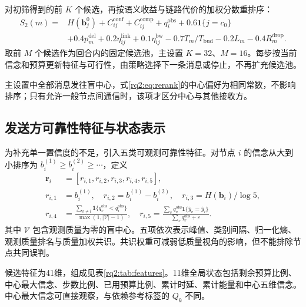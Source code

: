 对初筛得到的前 $K$ 个候选，再按语义收益与链路代价的加权分数重排序：
\begin{equation}
\begin{aligned}
S_2(m)={}&H(\bm b_j^0)+C_{ij}^{\mathrm{conf}}+C_{ij}^{\mathrm{comp}}+q_i^{\mathrm{obs}}
+0.6\mathbf1\{j=c_0\}\\
&+0.4p_m^{\mathrm{del}}+0.2\eta_{ij}^{\mathrm{link}}+0.1\eta_{ij}^{\mathrm{bw}}
-0.7T_m/T_{\mathrm{bud}}-0.2L_m-0.4R_m^{\mathrm{drop}}.
\end{aligned}
\label{rq2:eq:rerank}
\end{equation}
取前 $M$ 个候选作为回合内的固定候选池，主设置 $K=32$、$M=16$。每步按当前信念和预算更新特征与可行性，由策略选择下一条消息或停止，不再扩充候选池。

主设置中全部消息发往盲中心，式\eqref{rq2:eq:rerank}的中心偏好为相同常数，不影响排序；只有允许一般节点间通信时，该项才区分中心与其他接收方。

\subsection{发送方可靠性特征与状态表示}
为补充单一置信度的不足，引入五类可观测可靠性特征。对节点 $i$ 的信念从大到小排序为 $b_i^{(1)}\geq b_i^{(2)}\geq\cdots$，定义
\begin{equation}
\begin{aligned}
\bm r_i&=[r_{i,1},r_{i,2},r_{i,3},r_{i,4},r_{i,5}],\\
r_{i,1}&=b_i^{(1)},\quad r_{i,2}=b_i^{(1)}-b_i^{(2)},\quad
r_{i,3}=H(\bm b_i)/\log5,\\
r_{i,4}&=\frac{\sum_{v\ne i}\mathbf1\{q_v^{\mathrm{obs}}<q_i^{\mathrm{obs}}\}}{\max(1,|\mathcal V|-1)},\quad
r_{i,5}=\frac{\sum_v q_v^{\mathrm{obs}}\mathbf1\{\hat y_v=\hat y_i\}}{\sum_v q_v^{\mathrm{obs}}+\varepsilon}.
\end{aligned}
\label{rq2:eq:reliability}
\end{equation}
其中 $\mathcal V$ 包含观测质量为零的盲中心。五项依次表示峰值、类别间隔、归一化熵、观测质量排名与质量加权共识。共识权重可减弱低质量视角的影响，但不能排除节点共同误判。

候选特征为41维，组成见表\ref{rq2:tab:features}。11维全局状态包括剩余预算比例、中心最大信念、步数比例、已用预算比例、累计时延、累计能量和中心五维信念。中心最大信念可直接观察，与依赖参考标签的 $Q_k$ 不同。

